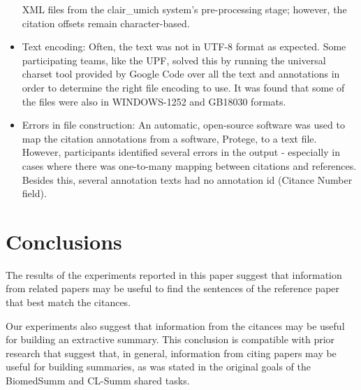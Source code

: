 \documentclass[11pt]{article}
\begin{document}
\begin{itemize}
	XML files from the clair\_umich system's pre-processing stage; however, the 
	citation offsets remain character-based.
\item{Text encoding: Often, the text was not in UTF-8 format as expected}. Some 
	participating teams, like the UPF, solved this by running the universal 	
	charset tool provided by Google Code over all the text and annotations in order 
	to determine the right file encoding to use. It was found that some of the files 
	were also in WINDOWS-1252 and GB18030 formats.
\item{Errors in file construction:} An automatic, open-source software was used 
	to map the citation annotations from a software, Protege, to a text file. 
	However, participants identified several errors in the output -  especially 
	in cases where there was one-to-many mapping between citations and references. 
	Besides this, several annotation texts had no annotation id 
	(Citance Number field). 
\end{itemize}

\section{Conclusions}

The results of the experiments reported in this paper suggest that information from 
related papers may be useful to find the sentences of the reference paper that best 
match the citances. 

Our experiments also suggest that information from the citances may be useful for 
building an extractive summary. This conclusion is compatible with prior research 
that suggest that, in general, information from citing papers may be useful for 
building summaries, as was stated in the original goals of the BiomedSumm and 
CL-Summ shared tasks.




\end{document}
